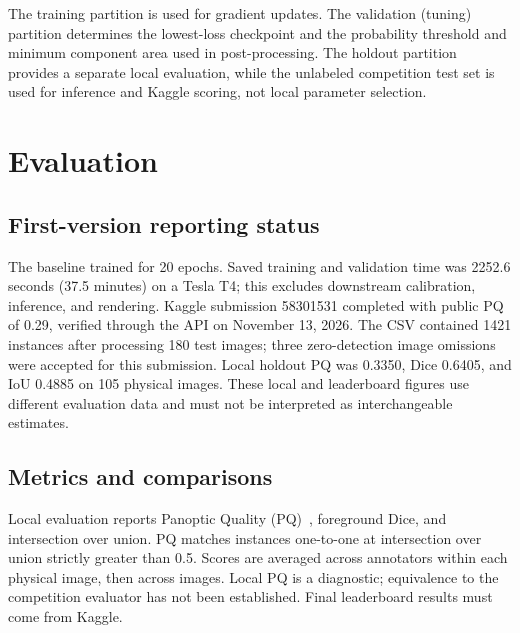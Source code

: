 \documentclass[sigconf]{acmart}
\begin{document}
The training partition is used for gradient updates. The validation
(tuning) partition determines the lowest-loss checkpoint and the
probability threshold and minimum component area used in post-processing.
The holdout partition provides a separate local evaluation, while the
unlabeled competition test set is used for inference and Kaggle scoring,
not local parameter selection.

\section{Evaluation}\label{sec:evaluation}

\subsection{First-version reporting status}
The baseline trained for 20 epochs. Saved training and validation time
was 2252.6 seconds (37.5 minutes) on a Tesla T4; this excludes downstream
calibration, inference, and rendering. Kaggle submission 58301531 completed
with public PQ of 0.29, verified through the API on November 13, 2026.
The CSV contained 1421 instances after processing 180 test images; three
zero-detection image omissions were accepted for this submission.
Local holdout PQ was 0.3350, Dice 0.6405, and IoU 0.4885 on 105 physical
images. These local and leaderboard figures use different evaluation data
and must not be interpreted as interchangeable estimates.

\subsection{Metrics and comparisons}
Local evaluation reports Panoptic Quality (PQ)~\cite{pq}, foreground
Dice, and intersection over union. PQ matches instances one-to-one
at intersection over union strictly greater than 0.5. Scores are averaged
across annotators within each physical image, then across images.
Local PQ is a diagnostic; equivalence to the competition evaluator has
not been established. Final leaderboard results must come from Kaggle.
\end{document}
